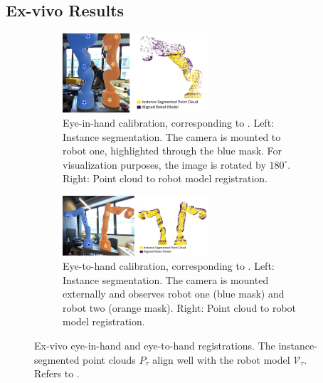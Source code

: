 \subsection{Ex-vivo Results}
\label{c1:sec:ex_vivo_results}
\begin{figure}[tb]
     \centering
     \begin{subfigure}[b]{\textwidth}
         \centering
         \includegraphics[width=0.6\textwidth]{img/visual_calibration/self_registration_combined_white.png}
         \caption{Eye-in-hand calibration, corresponding to . Left: Instance segmentation. The camera is mounted to robot one, highlighted through the blue mask. For visualization purposes, the image is rotated by $180^{\circ}$. Right: Point cloud to robot model registration.}
         \label{c1:fig:self_registration}
     \end{subfigure}
     \hfill
     \begin{subfigure}[b]{\textwidth}
         \centering
         \includegraphics[width=0.6\textwidth]{img/visual_calibration/double_registration_combined_white.png}
         \caption{Eye-to-hand calibration, corresponding to . Left: Instance segmentation. The camera is mounted externally and observes robot one (blue mask) and robot two (orange mask). Right: Point cloud to robot model registration.}
         \label{c1:fig:double_registration}
     \end{subfigure}
     \caption{Ex-vivo eye-in-hand and eye-to-hand registrations. The instance-segmented point clouds $P_\tau$ align well with the robot model $\mathcal{V}_\tau$. Refers to .}
     \label{c1:fig:registration_results}
\end{figure}

